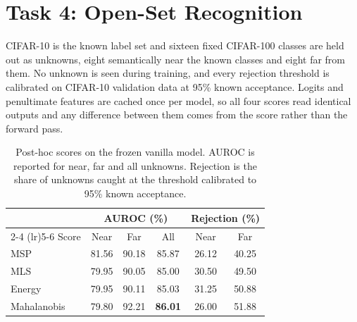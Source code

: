 \documentclass{article}
\begin{document}
\section{Task 4: Open-Set Recognition}
\label{sec:task4}

CIFAR-10 is the known label set and sixteen fixed CIFAR-100 classes are held
out as unknowns, eight semantically near the known classes and eight far from
them. No unknown is seen during training, and every rejection threshold is
calibrated on CIFAR-10 validation data at 95\% known acceptance. Logits and
penultimate features are cached once per model, so all four scores read
identical outputs and any difference between them comes from the score rather
than the forward pass.

\begin{table}[t]
  \centering
  \small
  \caption{Post-hoc scores on the frozen vanilla model. AUROC is reported for
  near, far and all unknowns. Rejection is the share of unknowns caught at
  the threshold calibrated to 95\% known acceptance.}
  \label{tab:t4-posthoc}
  \begin{tabular}{lccccc}
    \toprule
    & \multicolumn{3}{c}{AUROC (\%)} & \multicolumn{2}{c}{Rejection (\%)} \\
    \cmidrule(lr){2-4} \cmidrule(lr){5-6}
    Score & Near & Far & All & Near & Far \\
    \midrule
    MSP         & 81.56 & 90.18 & 85.87 & 26.12 & 40.25 \\
    MLS         & 79.95 & 90.05 & 85.00 & 30.50 & 49.50 \\
    Energy      & 79.95 & 90.11 & 85.03 & 31.25 & 50.88 \\
    Mahalanobis & 79.80 & 92.21 & \textbf{86.01} & 26.00 & 51.88 \\
    \bottomrule
  \end{tabular}
\end{table}
\end{document}
